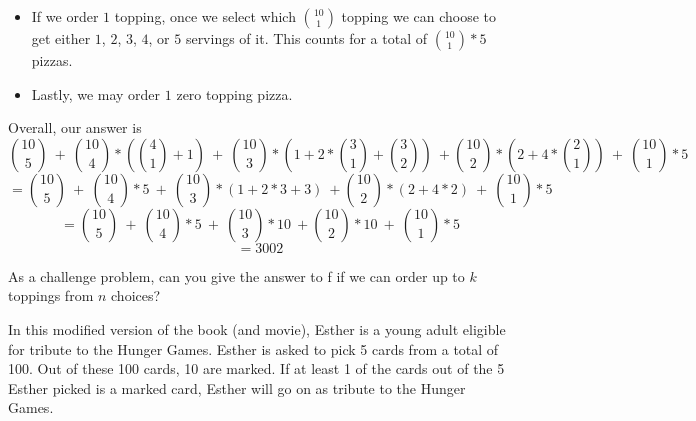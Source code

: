 \documentclass[]{article}
\newif\ifmotivation
\begin{document}
\begin{qunlist}
\begin{enumerate}[a)]
{{\begin{itemize}
 Therefore we have $\binom{10}{2} * (2 + 4*\binom{2}{1} )$
\item If we order $1$ topping, once we select which $\binom{10}{1}$ topping we can choose to get either $1$, $2$, $3$, $4$, or $5$ servings of it. This counts for a total of $\binom{10}{1}*5$ pizzas. 
\item Lastly, we may order $1$ zero topping pizza.
\end{itemize}
Overall, our answer is
$$\binom{10}{5} \ + \ \binom{10}{4}* (\binom{4}{1} + 1) \ + \ \binom{10}{3} * (1 + 2*\binom{3}{1} + \binom{3}{2}) \ + \binom{10}{2} * (2 + 4*\binom{2}{1} )\  + \ \binom{10}{1}*5$$
$$= \binom{10}{5} \ + \ \binom{10}{4}*5 \ + \ \binom{10}{3} * (1 + 2*3 + 3) \ + \binom{10}{2} * (2 + 4*2 )\  + \ \binom{10}{1}*5$$
$$= \binom{10}{5} \ + \ \binom{10}{4}*5 \ + \ \binom{10}{3} *10 \ + \binom{10}{2} *10\  + \ \binom{10}{1}*5$$ $$=3002$$


%






As a challenge problem, can you give the answer to f if we can order up to $k$ toppings from $n$ choices?

}}\fi

\end{enumerate}

\ifmotivation
{\motivation {Motivation - Counting continued but d) is tricky.}}
\fi 


%
%



In this modified version of the book (and movie), Esther is a young adult eligible for tribute to the Hunger Games. Esther is asked to pick 5 cards from a total of 100. Out of these 100 cards, 10 are marked. If at least 1 of the cards out of the 5 Esther picked is a marked card, Esther will go on as tribute to the Hunger Games. 


\end{qunlist}
\end{document}
